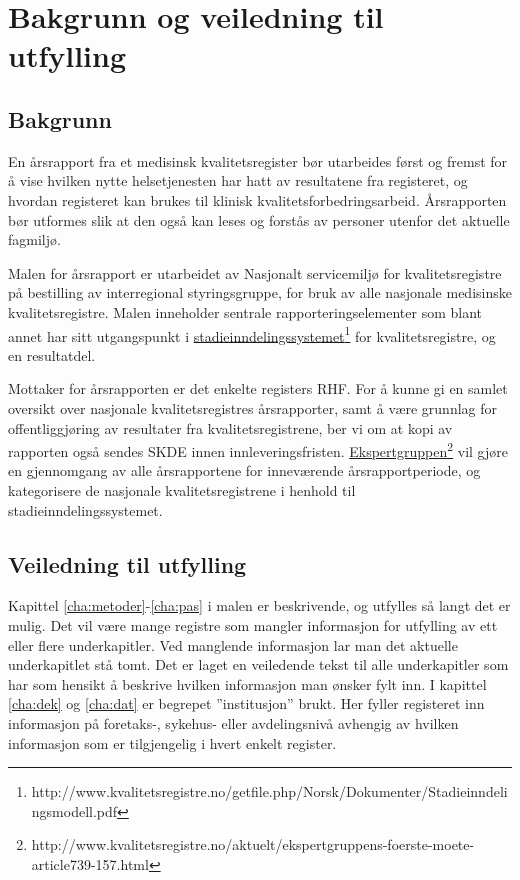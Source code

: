 \documentclass[norsk, a4paper, twocolumn]{report}
\begin{document}
\fi

\chapter*{Bakgrunn og veiledning til utfylling}

\section*{Bakgrunn}
En årsrapport fra et medisinsk kvalitetsregister bør utarbeides først og
fremst for å vise hvilken nytte helsetjenesten har hatt av resultatene fra
registeret, og
hvordan registeret kan brukes til klinisk kvalitetsforbedringsarbeid.
Årsrapporten bør utformes slik
at den også kan leses og forstås av personer utenfor det aktuelle fagmiljø.

Malen for årsrapport er utarbeidet av Nasjonalt servicemiljø for
kvalitetsregistre på bestilling av interregional styringsgruppe, for bruk av alle
nasjonale medisinske kvalitetsregistre. Malen inneholder sentrale
rapporteringselementer som blant annet har sitt utgangspunkt i
\href{http://www.kvalitetsregistre.no/getfile.php/Norsk/Dokumenter/Stadieinndelingsmodell.pdf}{stadieinndelingssystemet}\footnote{http://www.kvalitetsregistre.no/getfile.php/Norsk/Dokumenter/Stadieinndelingsmodell.pdf}
for kvalitetsregistre, og en resultatdel.

Mottaker for årsrapporten er det enkelte registers RHF. For å kunne gi en
samlet oversikt over nasjonale kvalitetsregistres
årsrapporter, samt å være grunnlag for offentliggjøring av resultater fra
kvalitetsregistrene, ber vi om at kopi av rapporten også sendes SKDE innen
innleveringsfristen.
\href{http://www.kvalitetsregistre.no/aktuelt/ekspertgruppens-foerste-moete-article739-157.html}{Ekspertgruppen}\footnote{http://www.kvalitetsregistre.no/aktuelt/ekspertgruppens-foerste-moete-article739-157.html}
vil gjøre en gjennomgang av alle årsrapportene for inneværende
årsrapportperiode, og kategorisere de nasjonale kvalitetsregistrene i henhold
til stadieinndelingssystemet.



\section*{Veiledning til utfylling}

Kapittel \ref{cha:metoder}-\ref{cha:pas} i malen er beskrivende, og utfylles så
langt det er mulig. Det vil
være mange registre som mangler informasjon for utfylling av ett eller flere
underkapitler. Ved manglende informasjon lar man det aktuelle underkapitlet
stå tomt. Det er laget en veiledende tekst til alle underkapitler som har
som hensikt å beskrive hvilken informasjon man ønsker fylt inn. I kapittel
\ref{cha:dek} og \ref{cha:dat}
er begrepet ”institusjon” brukt. Her fyller registeret inn informasjon på
foretaks-, sykehus- eller avdelingsnivå avhengig av hvilken informasjon som er
tilgjengelig i hvert enkelt register. 
\end{document}
